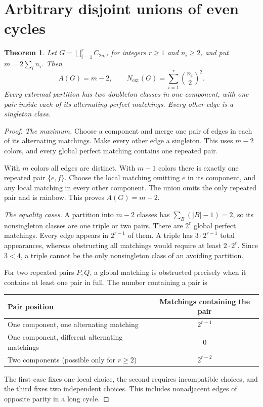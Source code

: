 \documentclass[11pt,letterpaper]{article}
\newtheorem{theorem}{Theorem}
\newcommand{\Next}{N_{\mathrm{ext}}}
\begin{document}
\newpage
\section{Arbitrary disjoint unions of even cycles}
\begin{theorem}\label{thm:unions}
Let $G=\bigsqcup_{i=1}^{r}C_{2n_i}$, for integers $r\ge1$ and $n_i\ge2$, and put
$m=2\sum_i n_i$. Then
\[
 A(G)=m-2,\qquad \Next(G)=\sum_{i=1}^{r}\binom{n_i}{2}^{\!2}.
\]
Every extremal partition has two doubleton classes in one component, with
one pair inside each of its alternating perfect matchings. Every other edge
is a singleton class.
\end{theorem}
\begin{proof}
\emph{The maximum.} Choose a component and merge one pair of edges in each
of its alternating matchings. Make every other edge a singleton. This uses
$m-2$ colors, and every global perfect matching contains one repeated pair.

With $m$ colors all edges are distinct. With $m-1$ colors there is exactly
one repeated pair $\{e,f\}$. Choose the local matching omitting $e$ in its
component, and any local matching in every other component. The union omits
the only repeated pair and is rainbow. This proves $A(G)=m-2$.

\emph{The equality cases.} A partition into $m-2$ classes has
$\sum_B(|B|-1)=2$, so its nonsingleton classes are one triple or two pairs.
There are $2^r$ global perfect matchings. Every edge appears in $2^{r-1}$
of them. A triple has $3\cdot2^{r-1}$ total appearances, whereas obstructing
all matchings would require at least $2\cdot2^r$. Since $3<4$, a triple
cannot be the only nonsingleton class of an avoiding partition.

For two repeated pairs $P,Q$, a global matching is obstructed precisely
when it contains at least one pair in full. The number containing a pair is
\begin{center}\small
\begin{tabular}{@{}lc@{}}
\toprule
Pair position & Matchings containing the pair\\
\midrule
One component, one alternating matching & $2^{r-1}$\\
One component, different alternating matchings & $0$\\
Two components (possible only for $r\ge2$) & $2^{r-2}$\\
\bottomrule
\end{tabular}
\end{center}
The first case fixes one local choice, the second requires incompatible
choices, and the third fixes two independent choices. This includes
nonadjacent edges of opposite parity in a long cycle.


\end{proof}
\end{document}
